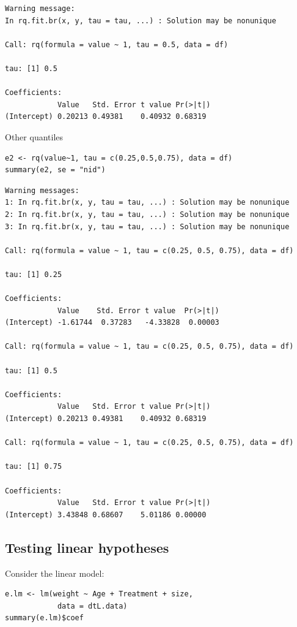 \documentclass{article}
\begin{document}
\begin{verbatim}
Warning message:
In rq.fit.br(x, y, tau = tau, ...) : Solution may be nonunique

Call: rq(formula = value ~ 1, tau = 0.5, data = df)

tau: [1] 0.5

Coefficients:
            Value   Std. Error t value Pr(>|t|)
(Intercept) 0.20213 0.49381    0.40932 0.68319
\end{verbatim}

Other quantiles
\lstset{language=r,label= ,caption= ,captionpos=b,numbers=none}
\begin{lstlisting}
e2 <- rq(value~1, tau = c(0.25,0.5,0.75), data = df)
summary(e2, se = "nid")
\end{lstlisting}

\begin{verbatim}
Warning messages:
1: In rq.fit.br(x, y, tau = tau, ...) : Solution may be nonunique
2: In rq.fit.br(x, y, tau = tau, ...) : Solution may be nonunique
3: In rq.fit.br(x, y, tau = tau, ...) : Solution may be nonunique

Call: rq(formula = value ~ 1, tau = c(0.25, 0.5, 0.75), data = df)

tau: [1] 0.25

Coefficients:
            Value    Std. Error t value  Pr(>|t|)
(Intercept) -1.61744  0.37283   -4.33828  0.00003

Call: rq(formula = value ~ 1, tau = c(0.25, 0.5, 0.75), data = df)

tau: [1] 0.5

Coefficients:
            Value   Std. Error t value Pr(>|t|)
(Intercept) 0.20213 0.49381    0.40932 0.68319 

Call: rq(formula = value ~ 1, tau = c(0.25, 0.5, 0.75), data = df)

tau: [1] 0.75

Coefficients:
            Value   Std. Error t value Pr(>|t|)
(Intercept) 3.43848 0.68607    5.01186 0.00000
\end{verbatim}

\subsection{Testing linear hypotheses}
\label{sec:orgd7f75db}

Consider the linear model:
\lstset{language=r,label= ,caption= ,captionpos=b,numbers=none}
\begin{lstlisting}
e.lm <- lm(weight ~ Age + Treatment + size,
            data = dtL.data)
summary(e.lm)$coef
\end{lstlisting}
\end{document}
